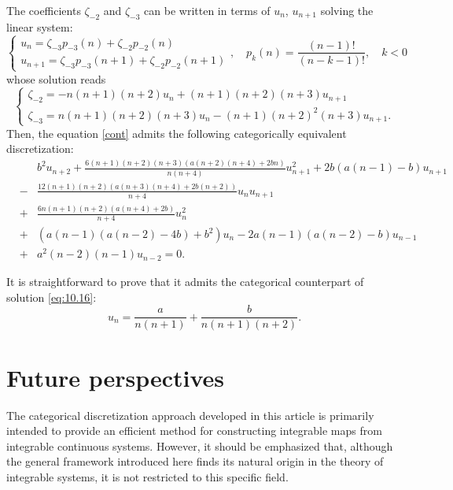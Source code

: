 \documentclass[10pt]{amsart}
\numberwithin{equation}{section}
\theoremstyle{definition}
\begin{document}
The coefficients $\zeta _{-2}$ and $\zeta _{-3}$ can be written in terms
of $u_{n}$, $u_{n+1}$ solving the linear system:
\begin{equation}
\begin{cases}
u_{n}=\zeta _{-3} p_{-3}(n)+\zeta _{-2} p_{-2}(n)
\\
u_{n+1}=\zeta _{-3} p_{-3}(n+1)+\zeta _{-2} p_{-2}(n+1)
\end{cases}
,\quad p_{k}(n)=\frac{(n-1)!}{(n-k-1)!},\quad k< 0
\label{eq11.11}
\end{equation}
whose solution reads
\begin{equation}
\begin{cases}
\zeta _{-2}= - n(n+1) (n+2) u_{n}+(n+1)(n+2)(n+3) u_{n+1}
\\
\zeta _{-3}= n(n+1) (n+2) (n+3) u_{n}-(n+1) (n+2)^{2} (n+3) u_{n+1}.
\end{cases}
\label{eq11.12}
\end{equation}
Then, the equation \eqref{cont} admits the following categorically equivalent
discretization:
\begin{eqnarray}
\nonumber
&&b^{2} u_{n+2} +\frac{6(n+1)(n+2)(n+3)(a (n+2) (n+4)+2 b n)}{n(n+4)}u_{n+1}^{2}
+2b(a(n-1)-b)u_{n+1}
\\
\nonumber
&-&\frac{12(n+1)(n+2)(a(n+3)(n+4)+2 b(n+2))}{n+4}u_{n} u_{n+1} \\
\nonumber
&+&
\frac{6n(n+1)(n+2)(a (n+4)+2 b)}{n+4}u_{n}^{2}
\\
\nonumber
&+&(a(n-1)(a(n-2)-4b)+b^{2})u_{n}-2a(n-1)(a(n-2)-b)u_{n-1} \\
\nonumber
&+&a^{2}(n-2)(n-1)u_{n-2}
=0.
\end{eqnarray}

It is straightforward to prove that it admits the categorical counterpart
of solution  \eqref{eq:10.16}:
\begin{equation}
u_{n}=\frac{a}{n(n+1)}+\frac{b}{n(n+1)(n+2)}.
\label{eq11.13}
\end{equation}

\section{Future perspectives}
\label{sec12}

The categorical discretization approach developed in this article is primarily
intended to provide an efficient method for constructing integrable maps
from integrable continuous systems. However, it should be emphasized that,
although the general framework introduced here finds its natural origin
in the theory of integrable systems, it is not restricted to this specific
field.
\end{document}
